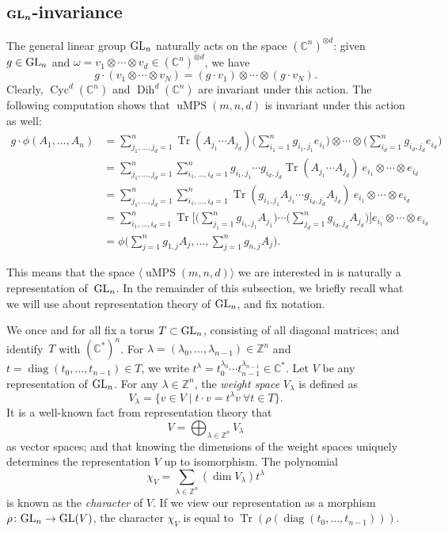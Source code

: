 \documentclass[10pt,a4paper]{amsart}
\numberwithin{equation}{section}
\DeclareMathOperator{\Tr}{Tr}
\DeclareMathOperator{\diag}{diag}
\newcommand{\ZZ}{\mathbb{Z}}
\newcommand{\CC}{\mathbb{C}}
\DeclareMathOperator{\uMPS}{uMPS}
\DeclareMathOperator{\Cyc}{Cyc}
\DeclareMathOperator{\Dih}{Dih}
\begin{document}
\subsection[GL_n-invariance]{$\boldsymbol{{\rm GL}_n}$-invariance}
The general linear group ${\rm GL}_n$ naturally acts on the space $({\mathbb C}^n)^{\otimes d}$: given $g\in {\rm GL}_n$ and $\omega=v_1 \otimes \cdots \otimes v_d\in ({\mathbb C}^n)^{\otimes d}$, we have
 \begin{equation*}%
 g\cdot (v_1\otimes \cdots \otimes v_N)= (g \cdot v_1)\otimes \cdots \otimes (g\cdot v_N).
 \end{equation*}
 Clearly, $\Cyc^d({\mathbb C}^n)$ and $\Dih^d({\mathbb C}^n)$ are invariant under this action. The following computation shows that $\uMPS(m,n,d)$ is invariant under this action as well:
 \begin{align*}
 	g\cdot \phi(A_1,\dots ,A_n)
 	&=\sum_{j_1,\dots, j_d=1}^{n} \Tr(A_{j_1}\cdots A_{j_d})  \bigg(\sum_{i_1=1}^{n}{g_{i_1,j_1}e_{i_1}}\bigg)\otimes \cdots \otimes \bigg(\sum_{i_d=1}^{n}{g_{i_d,j_d}e_{i_d}}\bigg) \\
 	&=\sum_{j_1,\dots, j_d=1}^{n} \sum_{i_1,\dots,i_d=1}^n g_{i_1,j_1} \cdots g_{i_d,j_d}\Tr(A_{j_1}\cdots A_{j_d}) \ e_{i_1}\otimes \cdots \otimes e_{i_d} \nonumber \\
 	&=\sum_{j_1,\dots, j_d=1}^{n} \sum_{i_1,\dots,i_d=1}^n \Tr(g_{i_1,j_1} A_{j_1}\cdots g_{i_d,j_d} A_{j_d}) \ e_{i_1}\otimes \cdots \otimes e_{i_d}\nonumber \\
 	&=\sum_{i_1,\dots,i_d=1}^n\Tr\bigg[\bigg(\sum_{j_1=1}^n g_{i_1,j_1}A_{j_1}\Big)\cdots \Big(\sum_{j_d=1}^n g_{i_d,j_d}A_{j_d}\bigg)\bigg]e_{i_1}\otimes \cdots \otimes e_{i_d}\nonumber \\
 	&= \phi\bigg(\sum_{j=1}^n g_{1,j} A_j, \dots ,\sum_{j=1}^n g_{n,j} A_j\bigg). \nonumber
 \end{align*}

 This means that the space $\langle \uMPS(m,n,d) \rangle$ we are interested in is naturally a representation of~${\rm GL}_n$.
 In the remainder of this subsection, we briefly recall what we will use about representation theory of ${\rm GL}_n$, and fix notation.

We once and for all fix a torus $T \subset {\rm GL}_n$, consisting of all diagonal matrices; and identify~$T$ with $(\CC^*)^n$.
For $\lambda=(\lambda_0,\dots,\lambda_{n-1}) \in \ZZ^n$ and $t=\diag(t_0,\dots,t_{n-1}) \in T$, we write $t^\lambda = t_0^{\lambda_0} \cdots t_{n-1}^{\lambda_{n-1}} \in \CC^*$.
Let $V$ be any representation of ${\rm GL}_n$.
For any $\lambda \in \ZZ^n$, the \emph{weight space} $V_{\lambda}$ is defined as
\[
V_{\lambda} = \big\{v \in V \mid t\cdot v = t^\lambda v \  \forall t \in T\big\}.
\]
It is a well-known fact from representation theory that
\[
V = \bigoplus_{\lambda \in \ZZ^n}{V_{\lambda}}
\]
as vector spaces; and that knowing the dimensions of the weight spaces uniquely determines the representation $V$ up to isomorphism.
The polynomial
\[
\chi_V = \sum_{\lambda \in \ZZ^n}{(\dim V_{\lambda}) t^{\lambda}}
\]
is known as the \emph{character} of $V$. If we view our representation as a morphism $\rho\colon {\rm GL}_n \to {\rm GL}(V)$, the character $\chi_V$ is equal to $\Tr(\rho(\diag(t_0,\dots,t_{n-1})))$.
\end{document}
